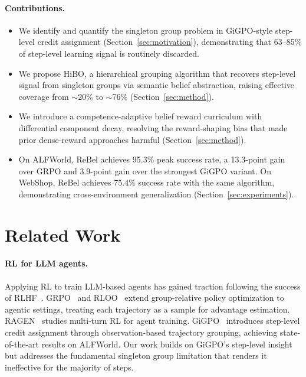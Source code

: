 \documentclass{article}
\begin{document}
\paragraph{Contributions.}
\begin{itemize}[leftmargin=1.5em,itemsep=2pt]
  \item We identify and quantify the singleton group problem in GiGPO-style
    step-level credit assignment (Section~\ref{sec:motivation}), demonstrating
    that 63--85\% of step-level learning signal is routinely discarded.
  \item We propose HiBO, a hierarchical grouping algorithm that recovers
    step-level signal from singleton groups via semantic belief abstraction,
    raising effective coverage from $\sim$20\% to $\sim$76\%
    (Section~\ref{sec:method}).
  \item We introduce a competence-adaptive belief reward curriculum with
    differential component decay, resolving the reward-shaping bias that made
    prior dense-reward approaches harmful (Section~\ref{sec:method}).
  \item On ALFWorld, ReBel achieves 95.3\% peak success rate, a 13.3-point
    gain over GRPO and 3.9-point gain over the strongest GiGPO variant.
    On WebShop, ReBel achieves 75.4\% success rate with the same algorithm,
    demonstrating cross-environment generalization
    (Section~\ref{sec:experiments}).
\end{itemize}


\section{Related Work}
\label{sec:related}

\paragraph{RL for LLM agents.}
Applying RL to train LLM-based agents has gained traction following the success
of RLHF~\citep{ouyang2022training}.
GRPO~\citep{shao2024deepseekmath} and RLOO~\citep{ahmadian2024back} extend
group-relative policy optimization to agentic settings, treating each trajectory
as a sample for advantage estimation.
RAGEN~\citep{wang2025ragen} studies multi-turn RL for agent training.
GiGPO~\citep{feng2025gigpo} introduces step-level credit assignment through
observation-based trajectory grouping, achieving state-of-the-art results on
ALFWorld.
Our work builds on GiGPO's step-level insight but addresses the fundamental
singleton group limitation that renders it ineffective for the majority of steps.
\end{document}
